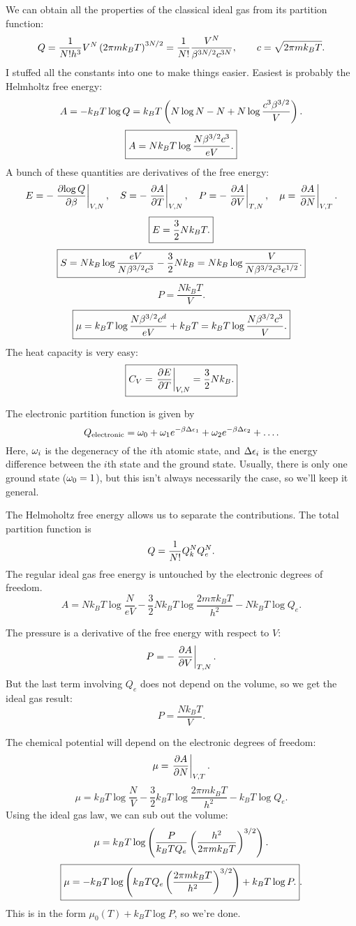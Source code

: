 \documentclass[12pt]{article}
\begin{document}
 We can obtain all the properties of the classical ideal gas from its partition function:
\[ Q = \frac{1}{N! h^3}V^N \left(2\pi m k_BT\right)^{3N/2}= \frac{1}{N!}\frac{V^N}{\beta^{3N/2}c^{3N}}, \qquad c = \sqrt{2\pi mk_BT}.\]
I stuffed all the constants into one to make things easier. Easiest is probably the Helmholtz free energy:
\[ A = -k_BT \log Q = k_BT\left(N\log N - N + N \log \frac{c^3\beta^{3/2}}{V}\right).\]
\[ \boxed{ A = Nk_BT \log \frac{N \beta^{3/2}c^3}{eV}.}\]
A bunch of these quantities are derivatives of the free energy:
\[ E = -\left.\frac{\partial{\log Q}}{\partial{\beta}}\right|_{V,N},\quad S = -\left.\frac{\partial{A}}{\partial{T}}\right|_{V,N}, \quad P = -\left.\frac{\partial{A}}{\partial{V}}\right|_{T,N},\quad \mu = \left.\frac{\partial{A}}{\partial{N}}\right|_{V,T}.\]
\[ \boxed{E = \frac{3}{2} Nk_BT.}\]
\[ \boxed{ S = Nk_B\log \frac{eV}{N\beta^{3/2}c^3} - \frac{3}{2}Nk_B = Nk_B \log \frac{V}{N\beta^{3/2}c^3 e^{1/2}}.}\]
\[ \boxed{ P = \frac{Nk_BT}{V}.}\]
\[ \boxed{ \mu = k_BT \log \frac{N\beta^{3/2}c^d}{eV} + k_BT = k_BT\log \frac{N\beta^{3/2}c^3}{V}.}\]
The heat capacity is very easy:
\[ \boxed{ C_V = \left.\frac{\partial{E}}{\partial{T}}\right|_{V,N} = \frac{3}{2}Nk_B.}\]

\hrulefill

 The electronic partition function is given by
\[ Q_\mathrm{electronic} = \omega_0 + \omega_1 e^{-\beta \Delta \epsilon_1} + \omega_2 e^{-\beta \Delta \epsilon_2} + \ldots.\]
Here, $\omega_i$ is the degeneracy of the $i$th atomic state, and $\Delta \epsilon_i$ is the energy difference between the $i$th state and the ground state. Usually, there is only one ground state ($\omega_0 = 1$), but this isn't always necessarily the case, so we'll keep it general.

 The Helmoholtz free energy allows us to separate the contributions. The total partition function is
\[ Q = \frac{1}{N!} Q_k^N Q_e^N.\]
The regular ideal gas free energy is untouched by the electronic degrees of freedom.
\[ A = Nk_BT \log\frac{N}{eV} - \frac{3}{2}Nk_BT \log \frac{2m\pi k_BT}{h^2} - Nk_BT \log Q_e.\]

 The pressure is a derivative of the free energy with respect to $V$:
\[ P = -\left.\frac{\partial{A}}{\partial{V}}\right|_{T,N}.\]
But the last term involving $Q_e$ does not depend on the volume, so we get the ideal gas result:
\[ P = \frac{Nk_BT}{V}.\]

 The chemical potential will depend on the electronic degrees of freedom:
\[ \mu = \left.\frac{\partial{A}}{\partial{N}}\right|_{V,T}.\]
\[ \mu = k_BT \log \frac{N}{V} - \frac{3}{2}k_BT \log \frac{2\pi mk_BT}{h^2} - k_BT\log Q_e.\]
Using the ideal gas law, we can sub out the volume:
\[ \mu = k_BT \log \left( \frac{P}{k_BTQ_e} \left(\frac{h^2}{2\pi m k_BT}\right)^{3/2} \right).\]
\[ \boxed{ \mu = -k_BT\log \left( {k_BTQ_e} \left(\frac{2\pi m k_BT}{h^2}\right)^{3/2} \right) + k_BT \log P.}.\]
This is in the form $\mu_0(T) + k_BT \log P$, so we're done.
\end{document}
